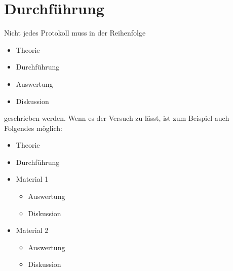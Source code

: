 \section{Durchführung}
\label{sec:Durchführung}

Nicht jedes Protokoll muss in der Reihenfolge
\begin{itemize}
  \item Theorie
  \item Durchführung
  \item Auswertung
  \item Diskussion
\end{itemize}
geschrieben werden.
Wenn es der Versuch zu lässt, ist zum Beispiel auch Folgendes möglich:
\begin{itemize}
  \item Theorie
  \item Durchführung
  \item Material 1
  \begin{itemize}
    \item Auswertung
    \item Diskussion
  \end{itemize}
  \item Material 2
  \begin{itemize}
    \item Auswertung
    \item Diskussion
  \end{itemize}
\end{itemize}
